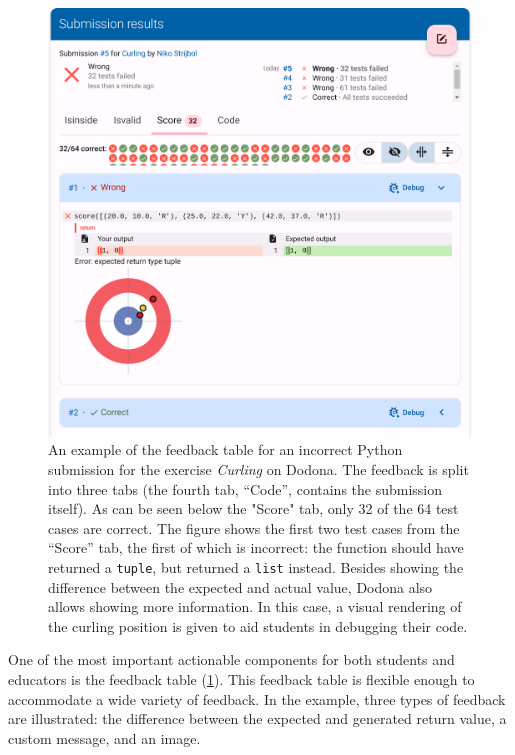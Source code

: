 \documentclass[../main]{subfiles}
\begin{document}
\begin{figure}
    \begin{wide}
        \includegraphics[width=\linewidth]{curling}
    \end{wide}
    \caption{
        An example of the feedback table for an incorrect Python submission for the exercise \textit{Curling} on Dodona.
        The feedback is split into three tabs (the fourth tab, ``Code'', contains the submission itself).
        As can be seen below the "Score" tab, only 32 of the 64 test cases are correct.
        The figure shows the first two test cases from the ``Score'' tab, the first of which is incorrect: the function should have returned a \texttt{tuple}, but returned a \texttt{list} instead.
        Besides showing the difference between the expected and actual value, Dodona also allows showing more information.
        In this case, a visual rendering of the curling position is given to aid students in debugging their code.
    }
    \label{fig:curling-feedback-table}
\end{figure}

One of the most important actionable components for both students and educators is the feedback table (\cref{fig:curling-feedback-table}).
This feedback table is flexible enough to accommodate a wide variety of feedback.
In the example, three types of feedback are illustrated: the difference between the expected and generated return value, a custom message, and an image.
\end{document}
